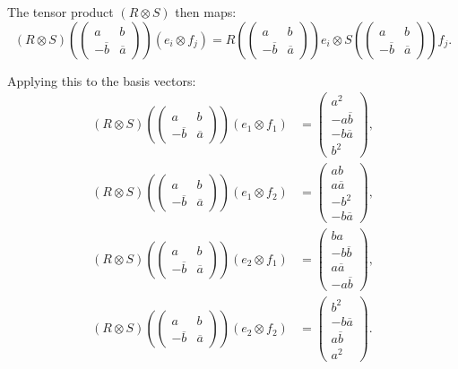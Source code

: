\documentclass{article}
\begin{document}
The tensor product \( (R \otimes S) \) then maps:
\[
(R \otimes S) \left(\begin{pmatrix} a & b \\ -\overline{b} & \overline{a} \end{pmatrix}\right) (e_i \otimes f_j) = R\left(\begin{pmatrix} a & b \\ -\overline{b} & \overline{a} \end{pmatrix}\right) e_i \otimes S\left(\begin{pmatrix} a & b \\ -\overline{b} & \overline{a} \end{pmatrix}\right) f_j.
\]

Applying this to the basis vectors:
\begin{align*}
(R \otimes S)\left(\begin{pmatrix} a & b \\ -\overline{b} & \overline{a} \end{pmatrix}\right) (e_1 \otimes f_1) &= \begin{pmatrix} a^2 \\ -a \overline{b} \\ -b \overline{a} \\ b^2 \end{pmatrix}, \\
(R \otimes S)\left(\begin{pmatrix} a & b \\ -\overline{b} & \overline{a} \end{pmatrix}\right) (e_1 \otimes f_2) &= \begin{pmatrix} ab \\ a \overline{a} \\ -b^2 \\ -b \overline{a} \end{pmatrix}, \\
(R \otimes S)\left(\begin{pmatrix} a & b \\ -\overline{b} & \overline{a} \end{pmatrix}\right) (e_2 \otimes f_1) &= \begin{pmatrix} ba \\ -b \overline{b} \\ a \overline{a} \\ -a \overline{b} \end{pmatrix}, \\
(R \otimes S)\left(\begin{pmatrix} a & b \\ -\overline{b} & \overline{a} \end{pmatrix}\right) (e_2 \otimes f_2) &= \begin{pmatrix} b^2 \\ -b \overline{a} \\ a \overline{b} \\ a^2 \end{pmatrix}.
\end{align*}
\end{document}
